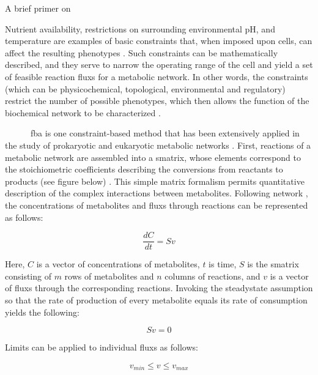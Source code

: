 \begin{pabox}[label=trends:box:fba,float*=h!,width=\textwidth]{A brief primer on }
\small
\begin{multicols}{2}
Nutrient availability, restrictions on surrounding 
environmental pH, and temperature are examples of basic 
constraints that, when imposed upon cells, can affect 
the resulting phenotypes \cite{Lee:2006je}. Such constraints can 
be mathematically described, and they serve to narrow 
the operating range of the cell and yield a set of feasible 
reaction \glspl{flux} for a metabolic network. In other words, 
the constraints (which can be physicochemical, 
topological, environmental and regulatory) restrict 
the number of possible phenotypes, which then allows 
the function of the biochemical network to be 
characterized \cite{Lee:2006je,Price:2004hx}.

~~~~~~\gls{fba} is one constraint-based 
method that has been extensively applied in the study 
of prokaryotic and eukaryotic metabolic networks \cite{Oberhardt:2008fr,Duarte:2007iu}. 
First, reactions of a metabolic network are assembled 
into a \gls{smatrix}, whose elements 
correspond to the stoichiometric coefficients describing 
the conversions from reactants to products (see figure below) \cite{Thiele:2010fr,Lee:2006je}. 
This simple matrix formalism permits quantitative 
description of the complex interactions between metabolites. 
Following network , the concentrations of 
metabolites and \glspl{flux} through reactions can be represented 
as follows:

\begin{equation} \label{trends:eq:massbalance}
\frac{dC}{dt} = S v
\end{equation}

Here, $C$ is a vector of concentrations of metabolites, $t$ is 
time, $S$ is the \gls{smatrix} consisting of $m$ rows 
of metabolites and $n$ columns of reactions, and $v$ is a 
vector of \glspl{flux} through the corresponding reactions. 
Invoking the \gls{steadystate} assumption so that the rate 
of production of every metabolite equals its rate of 
consumption yields the following:

\begin{equation} \label{trends:eq:steadystate}
Sv = 0
\end{equation}

Limits can be applied to individual \glspl{flux} as follows:

\begin{equation*}
v_{min} \leq v \leq v_{max}
\end{equation*}


\end{multicols}
\end{pabox}
